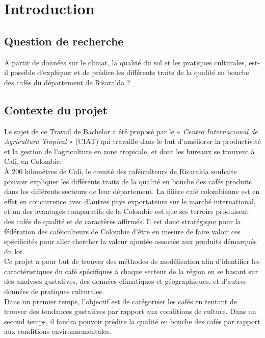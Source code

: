 


\chapter{Introduction}
\section{Question de recherche}

A partir de données sur le climat, la qualité du sol et les pratiques culturales, est-il possible d’expliquer et de prédire les différents traits de la qualité en bouche des cafés du département de Risaralda ?



\section{Contexte du projet}
Le sujet de ce Travail de Bachelor a été proposé par le « \textit{Centro Internacional de Agricultura Tropical }» (CIAT) qui travaille dans le but d’améliorer la productivité et la gestion de l’agriculture en zone tropicale, et dont les bureaux se trouvent à Cali, en Colombie.\\

À 200 kilomètres de Cali, le comité des caféiculteurs de Risaralda souhaite pouvoir expliquer les différents traits de la qualité en bouche des cafés produits dans les différents secteurs de leur département. La filière café colombienne est en effet en concurrence avec d’autres pays exportateurs sur le marché international, et un des avantages comparatifs de la Colombie est que ses terroirs produisent des cafés de qualité et de caractères affirmés. Il est donc stratégique pour la fédération des caféiculteurs de Colombie d'être en mesure de faire valoir ces spécificités pour aller chercher la valeur ajoutée associée aux produits démarqués du lot.\\


Ce projet a pour but de trouver des méthodes de modélisation afin d’identifier les caractéristiques du café spécifiques à chaque secteur de la région en se basant sur des analyses gustatives, des données climatiques et géographiques, et d’autres données de pratiques culturales.\\


Dans un premier temps, l’objectif est de catégoriser les cafés en tentant de trouver des tendances gustatives par rapport aux conditions de culture. Dans un second temps, il faudra pouvoir prédire la qualité en bouche des cafés par rapport aux conditions environnementales.\\


